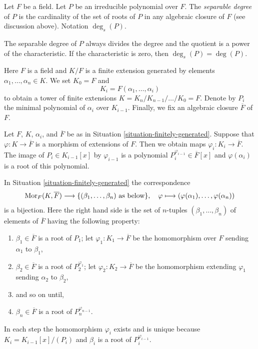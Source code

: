 \begin{definition}
\label{definition-separable-degree}
Let $F$ be a field. Let $P$ be an irreducible polynomial over $F$.
The {\it separable degree} of $P$ is the cardinality of the
set of roots of $P$ in any algebraic closure of $F$ (see discussion
above). Notation $\deg_s(P)$.
\end{definition}

\noindent
The separable degree of $P$ always divides the degree and the quotient
is a power of the characteristic. If the characteristic is zero, then
$\deg_s(P) = \deg(P)$.

\begin{situation}
\label{situation-finitely-generated}
Here $F$ is a field and $K/F$ is a finite extension generated by elements
$\alpha_1, \ldots, \alpha_n \in K$. We set $K_0 = F$ and
$$
K_i = F(\alpha_1, \ldots, \alpha_i)
$$
to obtain a tower of finite extensions
$K = K_n / K_{n - 1} / \ldots / K_0 = F$.
Denote by $P_i$ the minimal polynomial of $\alpha_i$ over $K_{i - 1}$.
Finally, we fix an algebraic closure $\overline{F}$ of $F$.
\end{situation}

\noindent
Let $F$, $K$, $\alpha_i$, and $\overline{F}$ be as in
Situation \ref{situation-finitely-generated}.
Suppose that $\varphi : K \to \overline{F}$ is a morphism of extensions
of $F$. Then we obtain maps $\varphi_i : K_i \to \overline{F}$.
The image of $P_i \in K_{i - 1}[x]$ by $\varphi_{i - 1}$
is a polynomial $P_i^{\varphi_{i - 1}} \in \overline{F}[x]$
and $\varphi(\alpha_i)$ is a root of this polynomial.

\begin{lemma}
\label{lemma-count-embeddings}
In Situation \ref{situation-finitely-generated} the correspondence
$$
\mathop{\mathrm{Mor}}\nolimits_F(K, \overline{F})
\longrightarrow
\{(\beta_1, \ldots, \beta_n)\text{ as below}\},
\quad
\varphi \longmapsto (\varphi(\alpha_1), \ldots, \varphi(\alpha_n))
$$
is a bijection. Here the right hand side is the set of $n$-tuples
$(\beta_1, \ldots, \beta_n)$ of elements of $\overline{F}$ having
the following property:
\begin{enumerate}
\item $\beta_1 \in \overline{F}$ is a root of $P_1$;
let $\varphi_1 : K_1 \to \overline{F}$ be the homomorphism
over $F$ sending $\alpha_1$ to $\beta_1$,
\item $\beta_2 \in \overline{F}$ is a root of $P_2^{\varphi_1}$;
let $\varphi_2 : K_2 \to \overline{F}$ be the homomorphism
extending $\varphi_1$ sending $\alpha_2$ to $\beta_2$,
\item and so on until,
\item $\beta_n \in \overline{F}$ is a root of $P_n^{\varphi_{n - 1}}$.
\end{enumerate}
In each step the homomorphism $\varphi_i$ exists and is unique because
$K_i = K_{i - 1}[x]/(P_i)$ and $\beta_i$ is a root of $P_i^{\varphi_{i - 1}}$.
\end{lemma}

